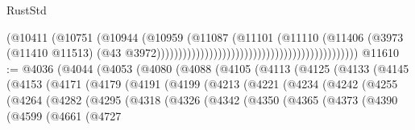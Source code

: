 \begin{lexlean}{RustStd}
\begin{coremodule}
{\begin{coremodule}
{{{{{{{{{{{{{{{{{{{{{{{{{{{{{{{{{{{{{{{{{{{{{{{{{{{{{{{{{{{{{{{{{{{{                                                                            (@10411
                                                                              (@10751
                                                                                (@10944
                                                                                  (@10959
                                                                                    (@11087
                                                                                      (@11101
                                                                                        (@11110
                                                                                          (@11406
                                                                                            (@3973
                                                                                              (@11410
                                                                                                @11513)
                                                                                              (@43
                                                                                                @3972))))))))))))))))))))))))))))))))))))))))))))))
@11610 := @4036
    (@4044
      (@4053
        (@4080
          (@4088
            (@4105
              (@4113
                (@4125
                  (@4133
                    (@4145
                      (@4153
                        (@4171
                          (@4179
                            (@4191
                              (@4199
                                (@4213
                                  (@4221
                                    (@4234
                                      (@4242
                                        (@4255
                                          (@4264
                                            (@4282
                                              (@4295
                                                (@4318
                                                  (@4326
                                                    (@4342
                                                      (@4350
                                                        (@4365
                                                          (@4373
                                                            (@4390
                                                              (@4599
                                                                (@4661
                                                                  (@4727
}}}}}}}}}}}}}}}}}}}}}}}}}}}}}}}}}}}}}}}}}}}}}}}}}}}}}}}}}}}}}}}}}}}}
\end{coremodule}}
\end{coremodule}
\end{lexlean}
